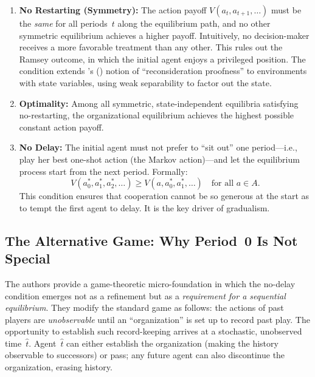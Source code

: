 \documentclass[12pt]{article}
\begin{document}
\begin{enumerate}
  \item \textbf{No Restarting (Symmetry):}  The action payoff
    $V(a_t, a_{t+1}, \ldots)$ must be the \emph{same} for all periods~$t$ along
    the equilibrium path, and no other symmetric equilibrium achieves a higher
    payoff.  Intuitively, no decision-maker receives a more favorable treatment
    than any other.  This rules out the Ramsey outcome, in which the initial
    agent enjoys a privileged position.  The condition extends
    \citeauthor{kocherlakota1996reconsideration}'s (\citeyear{kocherlakota1996reconsideration})
    notion of ``reconsideration proofness'' to environments with state variables,
    using weak separability to factor out the state.

  \item \textbf{Optimality:}  Among all symmetric, state-independent equilibria
    satisfying no-restarting, the organizational equilibrium achieves the highest
    possible constant action payoff.

  \item \textbf{No Delay:}  The initial agent must not prefer to ``sit out''
    one period---i.e., play her best one-shot action (the Markov action)---and
    let the equilibrium process start from the next period.  Formally:
    \[
      V(a_0^*, a_1^*, a_2^*, \ldots) \ge V(a, a_0^*, a_1^*, \ldots)
      \quad \text{for all } a \in A.
    \]
    This condition ensures that cooperation cannot be so generous at the start
    as to tempt the first agent to delay.  It is the key driver of gradualism.
\end{enumerate}

\subsection{The Alternative Game: Why Period~0 Is Not Special}

The authors provide a game-theoretic micro-foundation in which the no-delay
condition emerges not as a refinement but as a \emph{requirement for a
sequential equilibrium}.  They modify the standard game as follows: the actions
of past players are \emph{unobservable} until an ``organization'' is set up to
record past play.  The opportunity to establish such record-keeping arrives at a
stochastic, unobserved time~$\hat t$.  Agent~$\hat t$ can either establish the
organization (making the history observable to successors) or pass; any future
agent can also discontinue the organization, erasing history.
\end{document}
